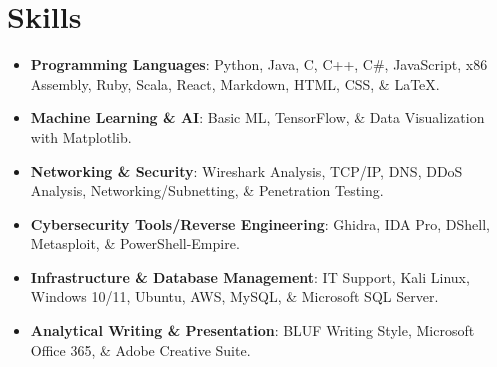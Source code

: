 \documentclass[letterpaper,11pt]{article} %
\begin{document}
\section{Skills} %
\begin{itemize}  %
    \item \textbf{Programming Languages}: Python, Java, C, C++, C\#, JavaScript, x86 Assembly, Ruby, Scala, React, Markdown, HTML, CSS, \& LaTeX. %
    \item \textbf{Machine Learning \& AI}: Basic ML, TensorFlow, \& Data Visualization with Matplotlib. %
    \item \textbf{Networking \& Security}: Wireshark Analysis, TCP/IP, DNS, DDoS Analysis, Networking/Subnetting, \& Penetration Testing. %
    \item \textbf{Cybersecurity Tools/Reverse Engineering}: Ghidra, IDA Pro, DShell, Metasploit, \& PowerShell-Empire. %
    \item \textbf{Infrastructure \& Database Management}: IT Support, Kali Linux, Windows 10/11, Ubuntu, AWS, MySQL, \& Microsoft SQL Server. %
    \item \textbf{Analytical Writing \& Presentation}: BLUF Writing Style, Microsoft Office 365, \& Adobe Creative Suite. %
\end{itemize} %
\end{document}
